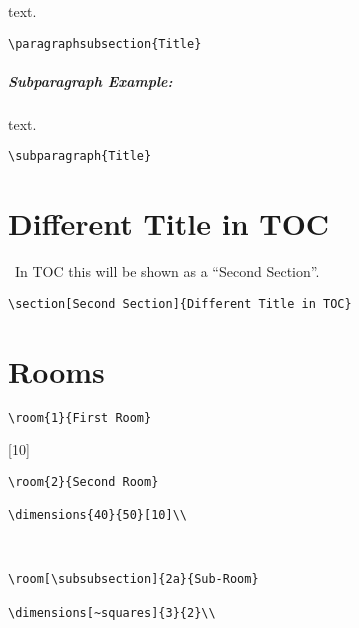 \documentclass[itdr]{subfiles}
\begin{document}
 text. 

\begin{lstlisting}
\paragraphsubsection{Title}
\end{lstlisting}

\subparagraph{Subparagraph Example:} text. 

\noindent
\begin{lstlisting}
\subparagraph{Title}
\end{lstlisting}

\break

\section[Second Section]{Different Title in TOC}

\faHandPointUp~In TOC this will be shown as a ``Second Section''.

\begin{lstlisting}
\section[Second Section]{Different Title in TOC}
\end{lstlisting}

\vfill

\section{Rooms}


\lipsum[66]

\begin{lstlisting}
\room{1}{First Room}
\end{lstlisting}


[10]\\
\lipsum[66]

\begin{lstlisting}
\room{2}{Second Room}

\dimensions{40}{50}[10]\\
\end{lstlisting}


\\
\lipsum[66]

\begin{lstlisting}
\room[\subsubsection]{2a}{Sub-Room}

\dimensions[~squares]{3}{2}\\
\end{lstlisting}
\end{document}
